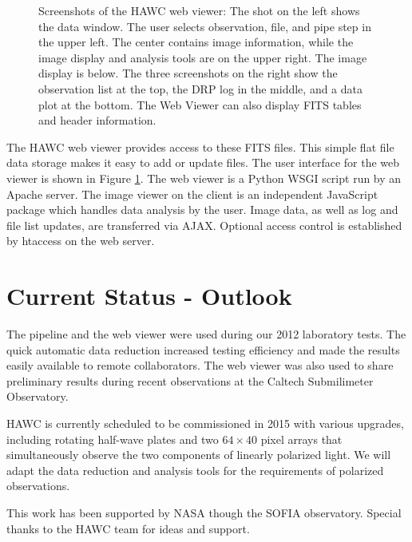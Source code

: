 \begin{figure}[!ht]

\caption{Screenshots of the HAWC web viewer: The shot on the left shows the data window. The user selects observation, file, and pipe step in the upper left. The center contains image information, while the image display and analysis tools are on the upper right. The image display is below. The three screenshots on the right show the observation list at the top, the DRP log in the middle, and a data plot at the bottom. The Web Viewer can also display FITS tables and header information.}

\label{fig_screen}

\end{figure}

The HAWC web viewer provides access to these FITS files. This simple flat file data storage makes it easy to add or update files. The user interface for the web viewer is shown in Figure \ref{fig_screen}. The web viewer is a Python WSGI script run by an Apache server. The image viewer on the client is an independent JavaScript package which handles data analysis by the user. Image data, as well as log and file list updates, are transferred via AJAX. Optional access control is established by htaccess on the web server.

\section{Current Status - Outlook}

The pipeline and the web viewer were used during our 2012 laboratory tests. The quick automatic data reduction increased testing efficiency and made the results easily available to remote collaborators. The web viewer was also used to share preliminary results during recent observations at the Caltech Submilimeter Observatory.

HAWC is currently scheduled to be commissioned in 2015 with various upgrades, including rotating half-wave plates and two $64\times40$ pixel arrays that simultaneously observe the two components of linearly polarized light. We will adapt the data reduction and analysis tools for the requirements of polarized observations.

\acknowledgements This work has been supported by NASA though the SOFIA observatory. Special thanks to the HAWC team for ideas and support.



